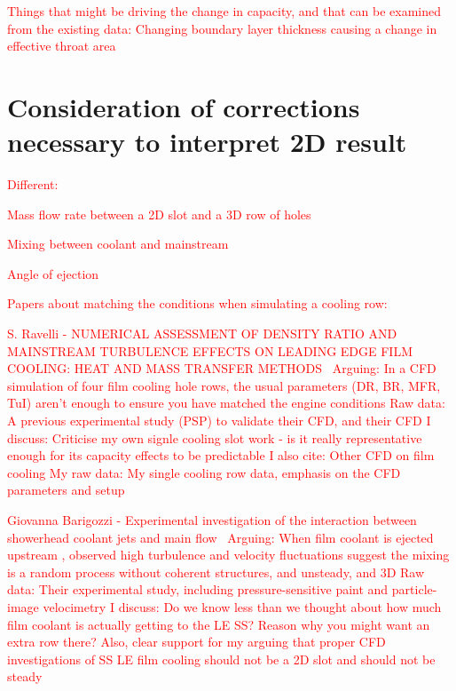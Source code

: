 \documentclass[a4paper, 11pt, twoside]{report}
\begin{document}
\textcolor{red}{Things that might be driving the change in capacity, and that can be examined from the existing data:}
	\textcolor{red}{Changing boundary layer thickness causing a change in effective throat area}

    
\section{Consideration of corrections necessary to interpret 2D result}

\textcolor{red}{Different:}

\textcolor{red}{Mass flow rate between a 2D slot and a 3D row of holes}

\textcolor{red}{Mixing between coolant and mainstream}

\textcolor{red}{Angle of ejection}

\textcolor{red}{Papers about matching the conditions when simulating a cooling row:}

\textcolor{red}{S. Ravelli - NUMERICAL ASSESSMENT OF DENSITY RATIO AND MAINSTREAM TURBULENCE EFFECTS ON LEADING EDGE FILM COOLING: HEAT AND MASS TRANSFER METHODS~\cite{ravelli_engine_conditions}}
		\textcolor{red}{Arguing: In a CFD simulation of four film cooling hole rows, the usual parameters (DR, BR, MFR, TuI) aren't enough to ensure you have matched the engine conditions}
		\textcolor{red}{Raw data: A previous experimental study (PSP) to validate their CFD, and their CFD}
		\textcolor{red}{I discuss: Criticise my own signle cooling slot work - is it really representative enough for its capacity effects to be predictable}
		\textcolor{red}{I also cite: Other CFD on film cooling}
		\textcolor{red}{My raw data: My single cooling row data, emphasis on the CFD parameters and setup}
		
\textcolor{red}{Giovanna Barigozzi - Experimental investigation of the interaction between showerhead coolant jets and main flow~\cite{barigozzi_film_cooling}}
		\textcolor{red}{Arguing: When film coolant is ejected upstream , observed high turbulence and velocity fluctuations suggest the mixing is a random process without coherent structures, and unsteady, and 3D}
		\textcolor{red}{Raw data: Their experimental study, including pressure-sensitive paint and particle-image velocimetry}
		\textcolor{red}{I discuss: Do we know less than we thought about how much film coolant is actually getting to the LE SS? Reason why you might want an extra row there? Also, clear support for my arguing that proper CFD investigations of SS LE film cooling should not be a 2D slot and should not be steady}
		
\end{document}

